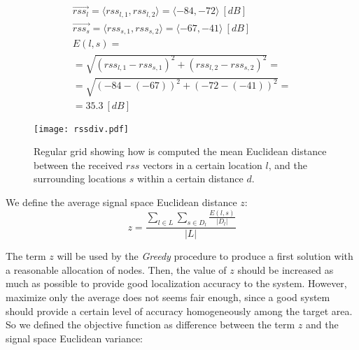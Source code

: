 \begin{figure}
\centering
\begin{minipage}{0.63\textwidth}

\begin{equation}
\begin{gathered}
\nonumber
\vec{rss_l} = \langle rss_{l,1}, rss_{l,2} \rangle = \langle-84, -72\rangle ~ [dB] \\
\vec{rss_s} = \langle rss_{s,1}, rss_{s,2} \rangle = \langle-67, -41\rangle ~ [dB] \\[5pt]
E(l,s) = \\ = \sqrt{(rss_{l,1} - rss_{s,1})^2 + (rss_{l,2} - rss_{s,2})^2} = \\
= \sqrt{(-84-(-67))^2 + (-72-(-41))^2} = \\ = 35.3 ~ [dB]
\end{gathered}
\end{equation}

\end{minipage}%
\begin{minipage}{0.37\textwidth}
\centering\texttt{[image: rssdiv.pdf]}
\end{minipage}
\caption{Regular grid showing how is computed the mean Euclidean distance between the received $rss$ vectors in a certain location \(l\), and the surrounding locations $s$ within a certain distance \(d\).}
\label{fig:rssdiv}
\end{figure}




We define the average signal space Euclidean distance $z$:
\begin{equation}\label{eq:z1}
z = \frac{ \sum\limits_{l \in L} \sum\limits_{s \in D_l}\frac{E(l,s)}{|D_l|}}{|L|}
\end{equation}

The term $z$ will be used by the \emph{Greedy} procedure to produce a first solution with a reasonable allocation of nodes. Then, the value of $z$ should be increased as much as possible to provide good localization accuracy to the system. However, maximize only the average does not seems fair enough, since a good system should provide a certain level of accuracy homogeneously among the target area. So we defined the objective function as difference between the term $z$ and the signal space Euclidean variance:

